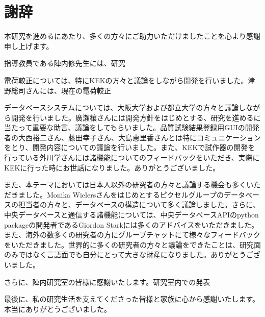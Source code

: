 \chapter*{謝辞}

本研究を進めるにあたり、多くの方々にご助力いただけましたことを心より感謝申し上げます。

指導教員である陣内修先生には、研究


電荷較正については、特にKEKの方々と議論をしながら開発を行いました。津野総司さんには、現在の電荷較正

データベースシステムについては、大阪大学および都立大学の方々と議論しながら開発を行いました。廣瀬穰さんには開発方針をはじめとする、研究を進めるに当たって重要な助言、議論をしてもらいました。品質試験結果登録用GUIの開発者の大西裕二さん、藤田幸子さん、大島恵里香さんとは特にコミュニケーションをとり、開発内容についての議論を行いました。また、KEKで試作器の開発を行っている外川学さんには諸機能についてのフィードバックをいただき、実際にKEKに行った時にお世話になりました。ありがとうございました。

また、本テーマにおいては日本人以外の研究者の方々と議論する機会も多くいただきました。Monika Wielersさんをはじめとするピクセルグループのデータベースの担当者の方々と、データベースの構造について多く議論しました。さらに、中央データベースと通信する諸機能については、中央データベースAPIのpython packageの開発者であるGiordon Starkには多くのアドバイスをいただきました。また、海外の数多くの研究者の方にグループチャットにて様々なフィードバックをいただきました。世界的に多くの研究者の方々と議論をできたことは、研究面のみではなく言語面でも自分にとって大きな財産になりました。ありがとうございました。

さらに、陣内研究室の皆様に感謝いたします。研究室内での発表

最後に、私の研究生活を支えてくださった皆様と家族に心から感謝いたします。本当にありがとうございました。
